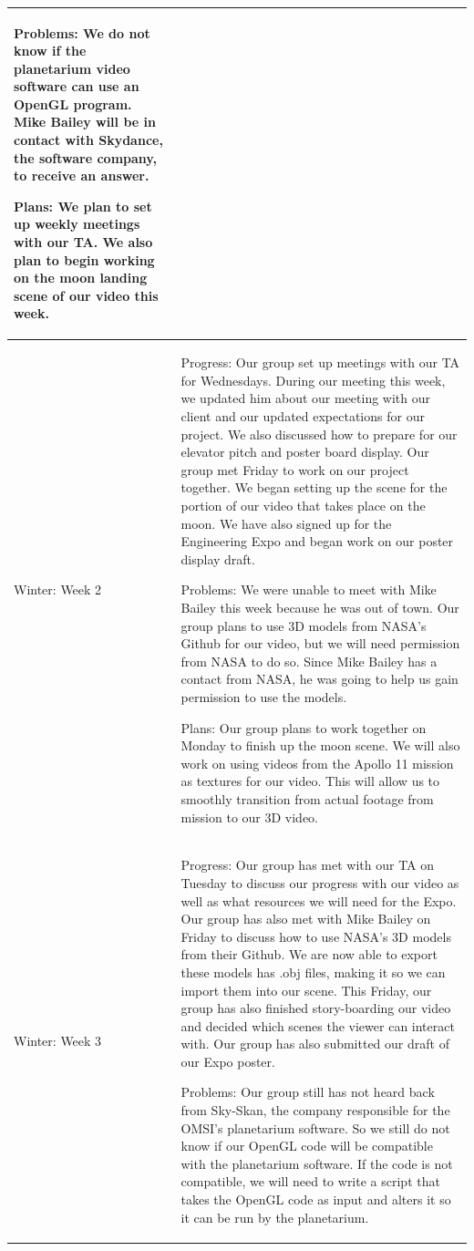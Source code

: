 \documentclass[onecolumn, draftclsnofoot,10pt, compsoc]{IEEEtran}
\begin{document}
\begin{longtable} {|p{1.5cm}|p{13.5cm}|}
Problems: We do not know if the planetarium video software can use an OpenGL program. Mike Bailey will be in contact with Skydance, the software company, to receive an answer.

Plans: We plan to set up weekly meetings with our TA. We also plan to begin working on the moon landing scene of our video this week.\\ \hline

Winter: Week 2 & 
Progress: Our group set up meetings with our TA for Wednesdays. During our meeting this week, we updated him about our meeting with our client and our updated expectations for our project. We also discussed how to prepare for our elevator pitch and poster board display. Our group met Friday to work on our project together. We began setting up the scene for the portion of our video that takes place on the moon. We have also signed up for the Engineering Expo and began work on our poster display draft.

Problems: We were unable to meet with Mike Bailey this week because he was out of town. Our group plans to use 3D models from NASA's Github for our video, but we will need permission from NASA to do so. Since Mike Bailey has a contact from NASA, he was going to help us gain permission to use the models. 

Plans: Our group plans to work together on Monday to finish up the moon scene. We will also work on using videos from the Apollo 11 mission as textures for our video. This will allow us to smoothly transition from actual footage from mission to our 3D video. 
\\ \hline

Winter: Week 3 &

Progress: Our group has met with our TA on Tuesday to discuss our progress with our video as well as what resources we will need for the Expo. Our group has also met with Mike Bailey on Friday to discuss how to use NASA's 3D models from their Github. We are now able to export these models has .obj files, making it so we can import them into our scene. This Friday, our group has also finished story-boarding our video and decided which scenes the viewer can interact with. Our group has also submitted our draft of our Expo poster.

Problems: Our group still has not heard back from Sky-Skan, the company responsible for the OMSI's planetarium software. So we still do not know if our OpenGL code will be compatible with the planetarium software. If the code is not compatible, we will need to write a script that takes the OpenGL code as input and alters it so it can be run by the planetarium.


\end{longtable}
\end{document}
